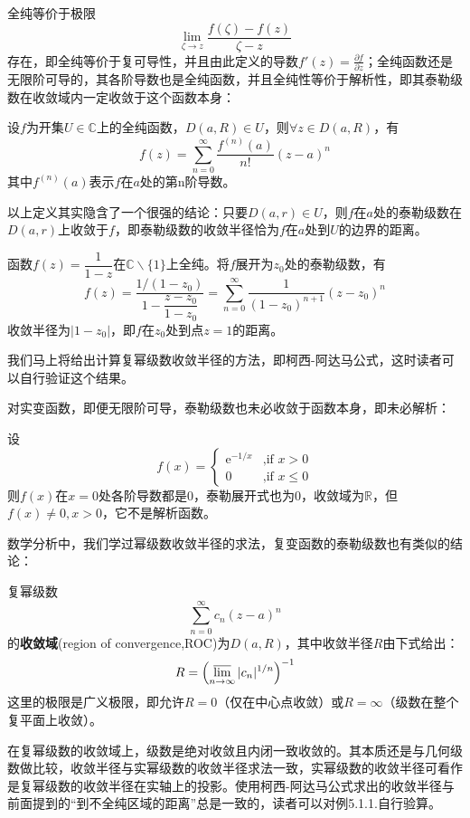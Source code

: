 \documentclass{ctexbook}
\begin{document}
全纯等价于极限\[\lim_{\zeta\to z}\frac{f(\zeta)-f(z)}{\zeta-z}\]
存在，即全纯等价于复可导性，并且由此定义的导数$f'(z)=\frac{\partial f}{\partial z}$；全纯函数还是无限阶可导的，其各阶导数也是全纯函数，并且全纯性等价于解析性，即其泰勒级数在收敛域内一定收敛于这个函数本身：
\begin{definition}[复变函数的泰勒级数展开]
    设$f$为开集$U\in\mathbb{C}$上的全纯函数，$D(a,R)\in U$，则$\forall z\in D(a,R)$，有
    \[f(z)=\sum_{n=0}^{\infty}\frac{f^{(n)}(a)}{n!}(z-a)^n\]
    其中$f^{(n)}(a)$表示$f$在$a$处的第n阶导数。
\end{definition}

以上定义其实隐含了一个很强的结论：只要$D(a,r)\in U$，则$f$在$a$处的泰勒级数在$D(a,r)$上收敛于$f$，即泰勒级数的收敛半径恰为$f$在$a$处到$U$的边界的距离。
\begin{example}
    函数$f(z)=\dfrac{1}{1-z}$在$\mathbb{C}\backslash\{1\}$上全纯。将$f$展开为$z_0$处的泰勒级数，有
    \[f(z)=\frac{1/(1-z_0)}{1-\dfrac{z-z_0}{1-z_0}}=\sum_{n=0}^{\infty}\frac{1}{(1-z_0)^{n+1}}(z-z_0)^n\]
    收敛半径为$|1-z_0|$，即$f$在$z_0$处到点$z=1$的距离。

    我们马上将给出计算复幂级数收敛半径的方法，即柯西-阿达马公式，这时读者可以自行验证这个结果。
\end{example}

对实变函数，即便无限阶可导，泰勒级数也未必收敛于函数本身，即未必解析：
\begin{example}
    设$$f(x)=\begin{cases}
    \mathrm{e}^{-1/x}&\text{,if\ }x> 0\\
    0&\text{,if\ }x\leq 0
    \end{cases}$$
    则$f(x)$在$x=0$处各阶导数都是0，泰勒展开式也为0，收敛域为$\mathbb{R}$，但$f(x)\neq 0,x>0$，它不是解析函数。
\end{example}

数学分析中，我们学过幂级数收敛半径的求法，复变函数的泰勒级数也有类似的结论：
\begin{theorem}[柯西-阿达马公式]
    复幂级数\[\sum_{n=0}^{\infty}c_n(z-a)^n\]
    的\textbf{收敛域}(region of convergence,ROC)为$D(a,R)$，其中收敛半径$R$由下式给出：
    \[R=\left(\varlimsup_{n\to\infty}|c_n|^{1/n}\right)^{-1}\]
    这里的极限是广义极限，即允许$R=0$（仅在中心点收敛）或$R=\infty$（级数在整个复平面上收敛）。
\end{theorem}
在复幂级数的收敛域上，级数是绝对收敛且内闭一致收敛的。其本质还是与几何级数做比较，收敛半径与实幂级数的收敛半径求法一致，实幂级数的收敛半径可看作是复幂级数的收敛半径在实轴上的投影。使用柯西-阿达马公式求出的收敛半径与前面提到的“到不全纯区域的距离”总是一致的，读者可以对例5.1.1.自行验算。
\end{document}
